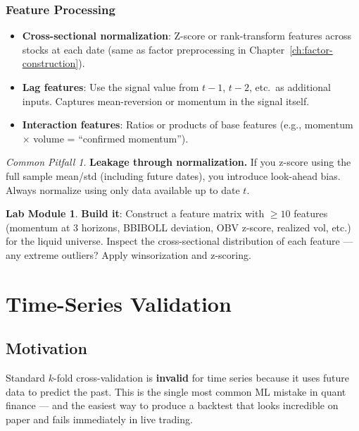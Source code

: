 \documentclass[a4paper, 11pt]{report}
\theoremstyle{definition}
\newtheorem{labmod}{Lab Module}[chapter]
\theoremstyle{remark}
\newtheorem{pitfall}{Common Pitfall}[chapter]
\begin{document}
\subsection{Feature Processing}

\begin{itemize}
    \item \textbf{Cross-sectional normalization}: Z-score or rank-transform
          features across stocks at each date (same as factor preprocessing
          in Chapter~\ref{ch:factor-construction}).
    \item \textbf{Lag features}: Use the signal value from $t-1$, $t-2$, etc.\
          as additional inputs.  Captures mean-reversion or momentum in the
          signal itself.
    \item \textbf{Interaction features}: Ratios or products of base features
          (e.g., momentum $\times$ volume = ``confirmed momentum'').
\end{itemize}

\begin{pitfall}
    \textbf{Leakage through normalization.}  If you z-score using the full
    sample mean/std (including future dates), you introduce look-ahead bias.
    Always normalize using only data available up to date $t$.
\end{pitfall}

\begin{labmod}
    \textbf{Build it}: Construct a feature matrix with $\geq 10$ features
    (momentum at 3 horizons, BBIBOLL deviation, OBV z-score, realized vol,
    etc.) for the liquid universe.  Inspect the cross-sectional distribution
    of each feature --- any extreme outliers?  Apply winsorization and z-scoring.
\end{labmod}


\chapter{Time-Series Validation}
\label{ch:ts-validation}

\section{Motivation}

Standard $k$-fold cross-validation is \textbf{invalid} for time series because
it uses future data to predict the past.  This is the single most common ML
mistake in quant finance --- and the easiest way to produce a backtest that
looks incredible on paper and fails immediately in live trading.
\end{document}
